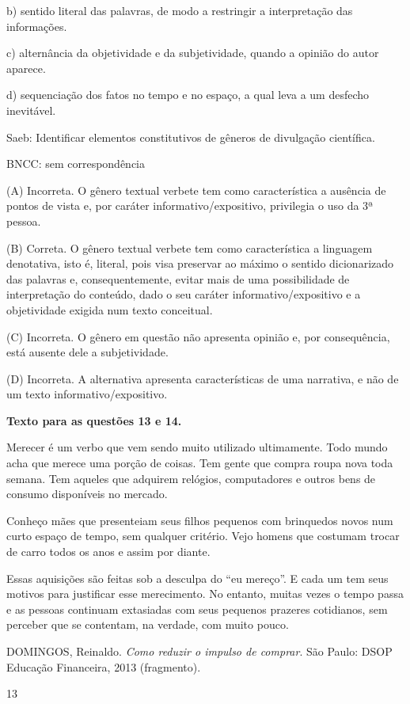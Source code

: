 b) sentido literal das palavras, de modo a restringir a interpretação
das informações.

c) alternância da objetividade e da subjetividade, quando a opinião do
autor aparece.

d) sequenciação dos fatos no tempo e no espaço, a qual leva a um
desfecho inevitável.

Saeb: Identificar elementos constitutivos de gêneros de divulgação
científica.

BNCC: sem correspondência

(A) Incorreta. O gênero textual verbete tem como característica a
ausência de pontos de vista e, por caráter informativo/expositivo,
privilegia o uso da 3ª pessoa.

(B) Correta. O gênero textual verbete tem como característica a
linguagem denotativa, isto é, literal, pois visa preservar ao máximo o
sentido dicionarizado das palavras e, consequentemente, evitar mais de
uma possibilidade de interpretação do conteúdo, dado o seu caráter
informativo/expositivo e a objetividade exigida num texto conceitual.

(C) Incorreta. O gênero em questão não apresenta opinião e, por
consequência, está ausente dele a subjetividade.

(D) Incorreta. A alternativa apresenta características de uma narrativa,
e não de um texto informativo/expositivo.

\textbf{Texto para as questões 13 e 14.}

Merecer é um verbo que vem sendo muito utilizado ultimamente. Todo mundo
acha que merece uma porção de coisas. Tem gente que compra roupa nova
toda semana. Tem aqueles que adquirem relógios, computadores e outros
bens de consumo disponíveis no mercado.

Conheço mães que presenteiam seus filhos pequenos com brinquedos novos
num curto espaço de tempo, sem qualquer critério. Vejo homens que
costumam trocar de carro todos os anos e assim por diante.

Essas aquisições são feitas sob a desculpa do ``eu mereço''. E cada um
tem seus motivos para justificar esse merecimento. No entanto, muitas
vezes o tempo passa e as pessoas continuam extasiadas com seus pequenos
prazeres cotidianos, sem perceber que se contentam, na verdade, com
muito pouco.

DOMINGOS, Reinaldo. \emph{Como reduzir o impulso de comprar}. São Paulo:
DSOP Educação Financeira, 2013 (fragmento).

\num{13}

